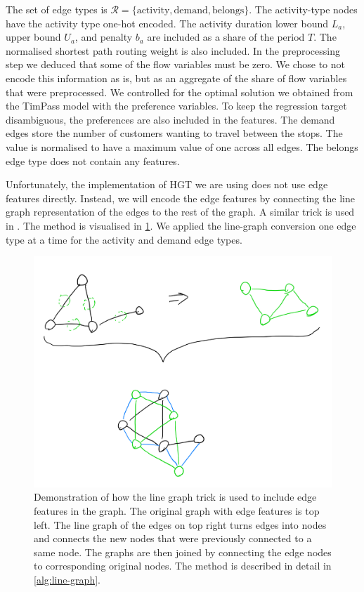 \documentclass[english, 12pt, a4paper, sci, utf8, a-2b, online]{aaltothesis}
\begin{document}
The set of edge types is $\mathcal{R} = \{\text{activity}, \text{demand}, \text{belongs}\}$. The activity-type nodes have the activity type one-hot encoded. The activity duration lower bound $L_a$, upper bound $U_a$, and penalty $b_a$ are included as a share of the period $T$. The normalised shortest path routing weight is also included. In the preprocessing step we deduced that some of the flow variables must be zero. We chose to not encode this information as is, but as an aggregate of the share of flow variables that were preprocessed. We controlled for the optimal solution we obtained from the TimPass model with the preference variables.
To keep the regression target disambiguous, the preferences are also included in the features.
The demand edges store the number of customers wanting to travel between the stops. The value is normalised to have a maximum value of one across all edges. The belongs edge type does not contain any features.

Unfortunately, the implementation of HGT we are using does not use edge features directly. Instead, we will encode the edge features by connecting the line graph representation of the edges to the rest of the graph. A similar trick is used in \cite{line-graph-trick}. The method is visualised in \cref{fig:line-graph}. We applied the line-graph conversion one edge type at a time for the activity and demand edge types.

\begin{figure}
    \centering
    \includegraphics[width=\textwidth]{figures/line-graphs.jpeg}
    \caption{Demonstration of how the line graph trick is used to include edge features in the graph. The original graph with edge features is top left. The line graph of the edges on top right turns edges into nodes and connects the new nodes that were previously connected to a same node. The graphs are then joined by connecting the edge nodes to corresponding original nodes. The method is described in detail in \cref{alg:line-graph}.}
    \label{fig:line-graph}
\end{figure}
\end{document}
